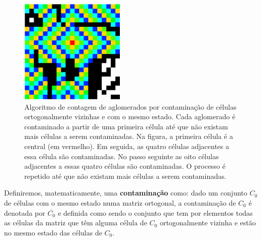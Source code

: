 \documentclass[
	12pt,				%
	openright,			%
	twoside,			%
	a4paper,			%
	english,			%
	french,				%
	spanish,			%
	brazil				%
	]{abntex2}
\begin{document}
\begin{figure}
    \centering
    \includegraphics[width=5cm]{contamination.png}
    \caption{Algoritmo de contagem de aglomerados por contaminação de células ortogonalmente vizinhas e com o mesmo estado. Cada aglomerado é contaminado a partir de uma primeira célula até que não existam mais células a serem contaminadas. Na figura, a primeira célula é a central (em vermelho). Em seguida, as quatro células adjacentes a essa célula são contaminadas. No passo seguinte as oito células adjacentes a essas quatro células são contaminadas. O processo é repetido até que não existam mais células a serem contaminadas.}
    \label{fig:contamination}
\end{figure}

 Definiremos, matematicamente, uma \textbf{contaminação} como: dado um conjunto $C_0$ de células com o mesmo estado numa matriz ortogonal, a contaminação de $C_0$ é denotada por $\overline{C_0}$ e definida como sendo o conjunto que tem por elementos todas as células da matriz que têm alguma célula de $C_0$ ortogonalmente vizinha e estão no mesmo estado das células de $C_0$. 
\end{document}

